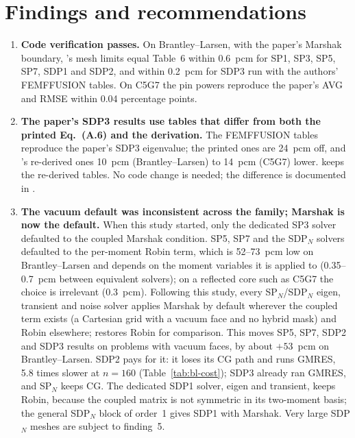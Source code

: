 \section{Findings and recommendations}
\label{sec:findings}

\begin{enumerate}
\item \textbf{Code verification passes.} On Brantley--Larsen, with the
  paper's Marshak boundary, \garnet's mesh limits equal Table~6 within
  0.6~pcm for SP1, SP3, SP5, SP7, SDP1 and SDP2, and within 0.2~pcm for SDP3
  run with the authors' FEMFFUSION tables. On C5G7 the pin powers reproduce
  the paper's AVG and RMSE within 0.04 percentage points.

\item \textbf{The paper's SDP3 results use tables that differ from both the
  printed Eq.~(A.6) and the derivation.} The FEMFFUSION tables reproduce the
  paper's SDP3 eigenvalue; the printed ones are 24~pcm off, and \garnet's
  re-derived ones 10~pcm (Brantley--Larsen) to 14~pcm (C5G7) lower.
  \garnet{} keeps the re-derived tables. No code change is needed; the
  difference is documented in .

\item \textbf{The vacuum default was inconsistent across the family;
  Marshak is now the default.} When this study started, only the dedicated
  SP3 solver defaulted to the coupled Marshak condition. SP5, SP7 and the
  SDP$_N$ solvers defaulted to the per-moment Robin term, which is 52--73~pcm
  low on Brantley--Larsen and depends on the moment variables it is applied
  to (0.35--0.7~pcm between equivalent solvers); on a reflected core such as
  C5G7 the choice is irrelevant (0.3~pcm). Following this study, every
  SP$_N$/SDP$_N$ eigen, transient and noise solver applies Marshak by default
  wherever the coupled term exists (a Cartesian grid with a vacuum face and no
  hybrid mask) and Robin elsewhere;  restores
  Robin for comparison. This moves SP5, SP7, SDP2 and SDP3 results on
  problems with vacuum faces, by about $+53$~pcm on Brantley--Larsen. SDP2
  pays for it: it loses its CG path and runs GMRES, 5.8 times slower at
  $n = 160$ (Table~\ref{tab:bl-cost}); SDP3 already ran GMRES, and SP$_N$
  keeps CG. The dedicated SDP1 solver, eigen and transient, keeps Robin,
  because the coupled matrix is not symmetric in its two-moment basis; the
  general SDP$_N$ block of order~1 gives SDP1 with Marshak. Very large
  SDP$_N$ meshes are subject to finding~5.


\end{enumerate}
